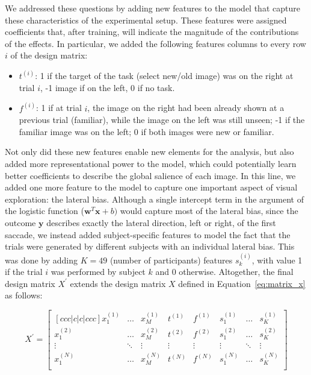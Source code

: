{We addressed these questions by adding new features to the model that capture these characteristics of the experimental setup. These features were assigned coefficients that, after training, will indicate the magnitude of the contributions of the effects. In particular, we added the following features columns to every row $i$ of the design matrix:

\begin{itemize}
 \item $t^{(i)}$: 1 if the target of the task (select new/old image) was on the right at trial $i$, -1  image if on the left, 0 if no task.
 \item $f^{(i)}$: 1 if at trial $i$, the image on the right had been already shown at a previous trial (familiar), while the image on the left was still unseen; -1 if the familiar image was on the left; 0 if both images were new or familiar.
\end{itemize}

Not only did these new features enable new elements for the analysis, but also added more representational power to the model, which could potentially learn better coefficients to describe the global salience of each image. In this line, we added one more feature to the model to capture one important aspect of visual exploration: the lateral bias. Although a single intercept term in the argument of the logistic function ($\mathbf{w}^{T}\mathbf{x} + b)$ would capture most of the lateral bias, since the outcome $\mathbf{y}$ describes exactly the lateral direction, left or right, of the first saccade, we instead added subject-specific features to model the fact that the trials were generated by different subjects with an individual lateral bias. This was done by adding $K = 49$ (number of participants) features $s_{k}^{(i)}$, with value 1 if the trial $i$ was performed by subject $k$ and 0 otherwise. Altogether, the final design matrix $X^{\prime}$ extends the design matrix $X$ defined in Equation~\ref{eq:matrix_x} as follows:

\begin{equation}
\label{eq:matrix_x_prime}
X^{\prime} = 
\begin{bmatrix}[ccc|c|c|ccc]
    x_{1}^{(1)} & \dots  & x_{M}^{(1)} & t^{(1)} & f^{(1)} & s_{1}^{(1)} & \dots  & s_{K}^{(1)} \\
    x_{1}^{(2)} & \dots  & x_{M}^{(2)} & t^{(2)} & f^{(2)} & s_{1}^{(2)} & \dots  & s_{K}^{(2)} \\
    \vdots      & \ddots & \vdots      & \vdots  & \vdots  & \vdots      & \ddots & \vdots      \\
    x_{1}^{(N)} & \dots  & x_{M}^{(N)} & t^{(N)} & f^{(N)} & s_{1}^{(N)} & \dots  & s_{K}^{(N)} \\
\end{bmatrix}
\end{equation}

}
